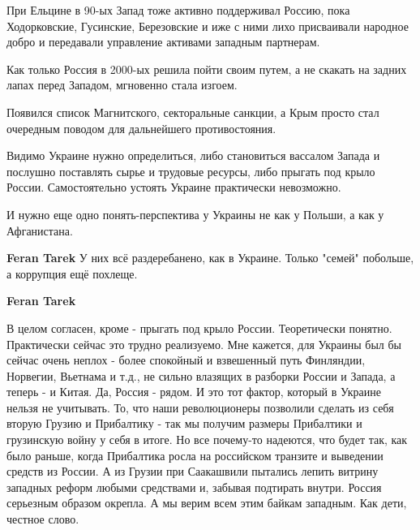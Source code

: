\begin{itemize}
 

При Ельцине в 90-ых Запад тоже активно поддерживал Россию, пока Ходорковские,
Гусинские, Березовские и иже с ними лихо присваивали народное добро и
передавали управление активами западным партнерам.

Как только Россия в 2000-ых решила пойти своим путем, а не скакать на задних
лапах перед Западом, мгновенно стала изгоем.

Появился список Магнитского, секторальные санкции, а Крым просто стал очередным
поводом для дальнейшего противостояния.

Видимо Украине нужно определиться, либо становиться вассалом Запада и послушно
поставлять сырье и трудовые ресурсы, либо прыгать под крыло России.
Самостоятельно устоять Украине практически невозможно.

И нужно еще одно понять-перспектива у Украины не как у Польши, а как у
Афганистана.

\begin{itemize}
 
\textbf{Feran Tarek}
У них всё раздеребанено, как в Украине. Только "семей" побольше, а коррупция ещё похлеще.

 
\textbf{Feran Tarek}

В целом согласен, кроме - прыгать под крыло России.
Теоретически понятно. Практически сейчас это трудно реализуемо. Мне кажется,
для Украины был бы сейчас очень неплох - более спокойный и взвешенный путь
Финляндии, Норвегии, Вьетнама и т.д., не сильно влазящих в разборки России и
Запада, а теперь - и Китая. Да, Россия - рядом. И это тот фактор, который в
Украине нельзя не учитывать. То, что наши революционеры позволили сделать из
себя вторую Грузию и Прибалтику - так мы получим размеры Прибалтики и
грузинскую войну у себя в итоге. Но все почему-то надеются, что будет так, как
было раньше, когда Прибалтика росла на российском транзите и выведении средств
из России. А из Грузии при Саакашвили пытались лепить витрину западных реформ
любыми средствами и, забывая подтирать внутри. Россия серьезным образом
окрепла. А мы верим всем этим байкам западным. Как дети, честное слово.
\end{itemize}


\end{itemize}
